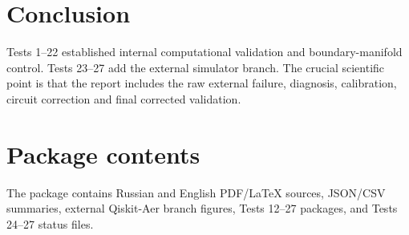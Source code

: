 \documentclass[12pt,a4paper]{article}
\begin{document}
\section{Conclusion}
Tests 1--22 established internal computational validation and boundary-manifold control. Tests 23--27 add the external simulator branch. The crucial scientific point is that the report includes the raw external failure, diagnosis, calibration, circuit correction and final corrected validation.

\appendix\section{Package contents}
The package contains Russian and English PDF/LaTeX sources, JSON/CSV summaries, external Qiskit-Aer branch figures, Tests 12--27 packages, and Tests 24--27 status files.
\end{document}
